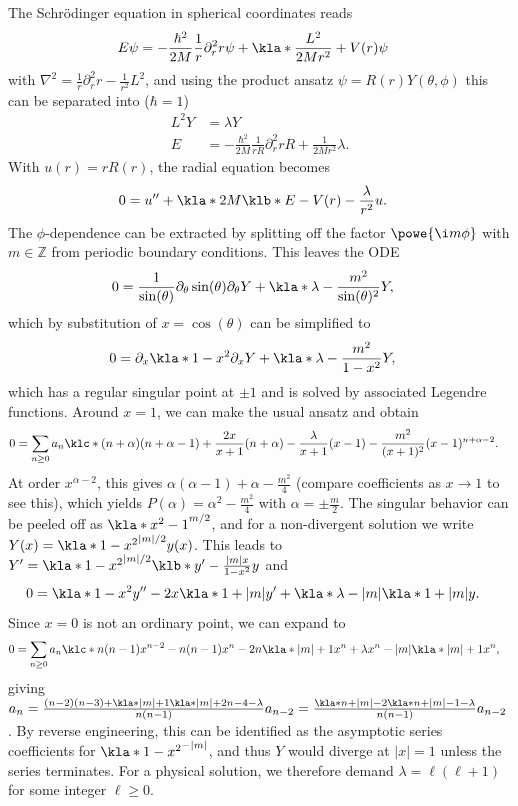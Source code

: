 \documentclass[english, parskip=full]{scrbook}
\newcommand{\example}[3]{\begin{tcolorbox}[colback=colorbackgroundexample,colframe=colorexample, breakable,enhanced,title={\textbf{#1}: #2.}]#3\end{tcolorbox}}
\begin{document}
\example{Hydrogen Atom}{with charge $Z$}{The Schrödinger equation in spherical coordinates reads
\begin{align}
E\psi &= -\frac{\hbar^2}{2M} \frac{1}{r} \partial_r^2 r\psi + \kla*{\frac{L^2}{2Mr^2} + V(r)}\psi
\end{align}
with $\nabla^2 = \frac{1}{r} \partial_r^2 r - \frac{1}{r^2}L^2$, and using the product ansatz $\psi = R(r)Y(\theta,\phi)$ this can be separated into ($\hbar=1$)
\begin{align}
L^2 Y &= \lambda Y\\
E &= -\frac{\hbar^2}{2M} \frac{1}{rR} \partial_r^2 rR + \frac{1}{2Mr^2}\lambda.
\end{align}
With $u(r)=rR(r)$, the radial equation becomes
\begin{align}
0 &= u'' + \kla*{2M\klb*{E - V(r)} - \frac{\lambda}{r^2}} u.
\end{align}
The $\phi$-dependence can be extracted by splitting off the factor $\powe{\i m\phi}$ with $m\in\mathbb{Z}$ from periodic boundary conditions.
This leaves the ODE
\begin{align}
0 &= \frac{1}{\sin(\theta)} \partial_\theta \sin(\theta)\partial_\theta Y + \kla*{\lambda - \frac{m^2}{\sin(\theta)^2}}Y,
\end{align}
which by substitution of $x=\cos(\theta)$ can be simplified to
\begin{align}
0 &= \partial_x \kla*{1-x^2}\partial_x Y + \kla*{\lambda - \frac{m^2}{1-x^2}}Y,
\end{align}
which has a regular singular point at $\pm 1$ and is solved by associated Legendre functions.
Around $x=1$, we can make the usual ansatz and obtain
\begin{align}
0 &= \sum_{n\ge 0} a_n \klc*{(n+\alpha)(n+\alpha-1) + \frac{2x}{x+1} (n+\alpha) - \frac{\lambda}{x+1} (x-1) - \frac{m^2}{(x+1)^2} } (x-1)^{n+\alpha-2}.
\end{align}
At order $x^{\alpha-2}$, this gives $\alpha(\alpha-1) + \alpha - \frac{m^2}{4}$ (compare coefficients as $x\rightarrow 1$ to see this), which yields $P(\alpha)=\alpha^2-\frac{m^2}{4}$ with $\alpha=\pm\frac{m}{2}$.
The singular behavior can be peeled off as $\kla*{x^2-1}^{m/2}$, and for a non-divergent solution we write $Y(x) = \kla*{1-x^2}^{|m|/2} y(x)$.
This leads to $Y'= \kla*{1-x^2}^{|m|/2} \klb*{y' - \frac{|m|x}{1-x^2} y}$ and
\begin{align}
0 &= \kla*{1-x^2}y'' - 2x\kla*{1+|m|} y' + \kla*{\lambda - |m|\kla*{1+|m|}}y.
\end{align}
Since $x=0$ is not an ordinary point, we can expand to
\begin{align}
0 &= \sum_{n\ge 0} a_n \klc*{n(n-1) x^{n-2} - n(n-1) x^n - 2n\kla*{|m|+1}x^n + \lambda x^n- |m|\kla*{|m|+1}x^n},
\end{align}
giving $a_{n} = \frac{(n-2)(n-3) + \kla*{|m|+1}\kla*{|m| + 2n - 4} - \lambda}{n(n-1)} a_{n-2} = \frac{\kla*{n+|m|-2}\kla*{n+|m|-1} - \lambda}{n(n-1)} a_{n-2}$.
By reverse engineering, this can be identified as the asymptotic series coefficients for $\kla*{1-x^2}^{-|m|}$, and thus $Y$ would diverge at $|x|=1$ unless the series terminates.
For a physical solution, we therefore demand $\lambda = \ell(\ell + 1)$ for some integer $\ell\ge 0$.

}
\end{document}
